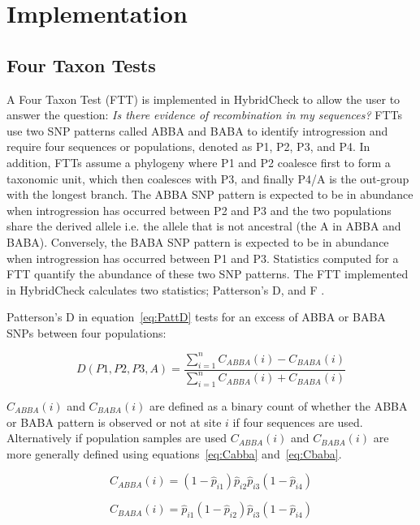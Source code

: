 \section{Implementation}
\subsection{Four Taxon Tests}
A Four Taxon Test (FTT) is implemented in HybridCheck to allow the user to answer the question: \textit{Is there evidence of recombination in my sequences?} FTTs use two SNP patterns called ABBA and BABA to identify introgression and require four sequences or populations, denoted as P1, P2, P3, and P4. In addition, FTTs assume a phylogeny where P1 and P2 coalesce first to form a taxonomic unit, which then coalesces with P3, and finally P4/A is the out-group with the longest branch. The ABBA SNP pattern is expected to be in abundance when introgression has occurred between P2 and P3 and the two populations share the derived allele i.e. the allele that is not ancestral (the A in ABBA and BABA). Conversely, the BABA SNP pattern is expected to be in abundance when introgression has occurred between P1 and P3.  Statistics computed for a FTT quantify the abundance of these two SNP patterns. The FTT implemented in HybridCheck calculates two statistics; Patterson’s D, and F \parencite{Durand2011}.

Patterson’s D in equation~\ref{eq:PattD} tests for an excess of ABBA or BABA SNPs between four populations:

\begin{equation}
	\label{eq:PattD}
	D(P1,P2,P3,A) = \frac{\sum_{i = 1}^{n} C_{ABBA}(i) - C_{BABA}(i)}{\sum_{i = 1}^{n} C_{ABBA}(i) + C_{BABA}(i)}
\end{equation}

$C_{ABBA}(i)$ and $C_{BABA}(i)$ are defined as a binary count of whether the ABBA or BABA pattern is observed or not at site $i$ if four sequences are used. Alternatively if population samples are used $C_{ABBA}(i)$ and $C_{BABA}(i)$ are more generally defined using equations~\ref{eq:Cabba} and~\ref{eq:Cbaba}.

\begin{equation}
	\label{eq:Cabba}
	C_{ABBA}(i) = (1 - \hat{p}_{i1})\hat{p}_{i2}\hat{p}_{i3}(1 - \hat{p}_{i4})
\end{equation}

\begin{equation}
	\label{eq:Cbaba}
	C_{BABA}(i) = \hat{p}_{i1}(1 - \hat{p}_{i2})\hat{p}_{i3}(1 - \hat{p}_{i4})
\end{equation}

